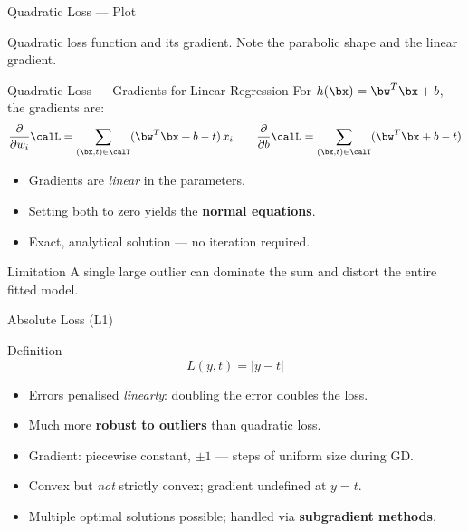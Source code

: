 \begin{frame}{Quadratic Loss — Plot}
  \begin{center}
  \end{center}
  \small Quadratic loss function and its gradient. Note the parabolic shape and the linear gradient.
\end{frame}

\begin{frame}{Quadratic Loss — Gradients for Linear Regression}
  For $h(\bx)=\bw^T\bx+b$, the gradients are:
  \[
    \frac{\partial}{\partial w_i}\calL
    = \sum_{(\bx,t)\in\calT}(\bw^T\bx+b-t)\,x_i
    \qquad
    \frac{\partial}{\partial b}\calL
    = \sum_{(\bx,t)\in\calT}(\bw^T\bx+b-t)
  \]
  \begin{itemize}
    \item Gradients are \emph{linear} in the parameters.
    \item Setting both to zero yields the \textbf{normal equations}.
    \item Exact, analytical solution — no iteration required.
  \end{itemize}
  \begin{alertblock}{Limitation}
    A single large outlier can dominate the sum and distort the entire fitted model.
  \end{alertblock}
\end{frame}

\begin{frame}{Absolute Loss (L1)}
  \begin{block}{Definition}
    \[ L(y,t) = |y-t| \]
  \end{block}
  \begin{itemize}
    \item Errors penalised \emph{linearly}: doubling the error doubles the loss.
    \item Much more \textbf{robust to outliers} than quadratic loss.
    \item Gradient: piecewise constant, $\pm 1$ — steps of uniform size during GD.
    \item Convex but \emph{not} strictly convex; gradient undefined at $y=t$.
    \item Multiple optimal solutions possible; handled via \textbf{subgradient methods}.
  \end{itemize}
\end{frame}

